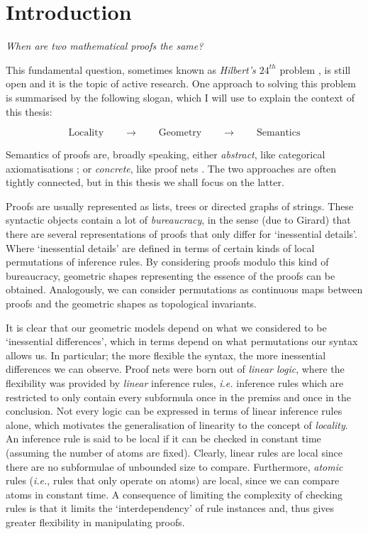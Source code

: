 \chapter{Introduction}

\emph{When are two mathematical proofs the same?}

This fundamental question, sometimes known as \emph{Hilbert's $24^{th}$} problem \cite{Thie:03:Hilberts:yu}, is still open and it is the topic of active research. One approach to solving this problem is summarised by the following slogan, which I will use to explain the context of this thesis:

\[
\mbox{Locality}\qquad\rightarrow\qquad\mbox{Geometry}\qquad\rightarrow\qquad\mbox{Semantics}
\]

Semantics of proofs are, broadly speaking, either \emph{abstract}, like categorical axiomatisations \cite{}; or \emph{concrete}, like proof nets \cite{Gira:87:Linear-L:wm}. The two approaches are often tightly connected, but in this thesis we shall focus on the latter.

Proofs are usually represented as lists, trees or directed graphs of strings. These syntactic objects contain a lot of \emph{bureaucracy}, in the sense (due to Girard) that there are several representations of proofs that only differ for `inessential details'. Where `inessential details' are defined in terms of certain kinds of local permutations of inference rules. By considering proofs modulo this kind of bureaucracy, geometric shapes representing the essence of the proofs can be obtained. Analogously, we can consider permutations as continuous maps between proofs and the geometric shapes as topological invariants.

It is clear that our geometric models depend on what we considered to be `inessential differences', which in terms depend on what permutations our syntax allows us. In particular; the more flexible the syntax, the more inessential differences we can observe. Proof nets were born out of \emph{linear logic}, where the flexibility was provided by \emph{linear} inference rules, \emph{i.e.} inference rules which are restricted to only contain every subformula once in the premiss and once in the conclusion. Not every logic can be expressed in terms of linear inference rules alone, which motivates the generalisation of linearity to the concept of \emph{locality}. An inference rule is said to be local if it can be checked in constant time (assuming the number of atoms are fixed). Clearly, linear rules are local since there are no subformulae of unbounded size to compare. Furthermore, \emph{atomic} rules (\emph{i.e.}, rules that only operate on atoms) are local, since we can compare atoms in constant time. A consequence of limiting the complexity of checking rules is that it limits the `interdependency' of rule instances and, thus gives greater flexibility in manipulating proofs.

